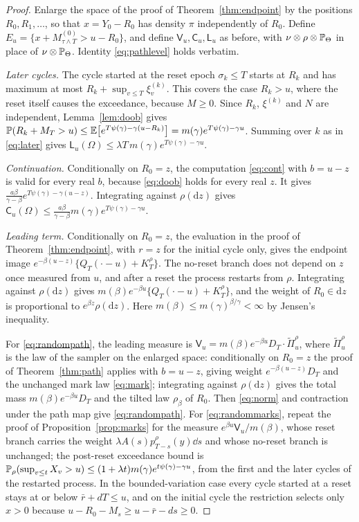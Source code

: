\documentclass[11pt,a4paper]{article}
\begin{document}
\begin{proof}
Enlarge the space of the proof of Theorem~\ref{thm:endpoint} by the positions $R_0,R_1,\dots$, so that $x=Y_0-R_0$ has density $\pi$ independently of $R_0$. Define $E_u=\{x+M^{(0)}_{\tau\wedge T}>u-R_0\}$, and define $\mathsf V_u,\mathsf C_u,\mathsf L_u$ as before, with $\nu\otimes\rho\otimes\mathbb P_\Theta$ in place of $\nu\otimes\mathbb P_\Theta$. Identity \eqref{eq:pathlevel} holds verbatim.

\emph{Later cycles.} The cycle started at the reset epoch $\sigma_k\le T$ starts at $R_k$ and has maximum at most $R_k+\sup_{v\le T}\xi^{(k)}_v$. This covers the case $R_k>u$, where the reset itself causes the exceedance, because $M\ge0$. Since $R_k$, $\xi^{(k)}$ and $N$ are independent, Lemma~\ref{lem:doob} gives $\mathbb P(R_k+M_T>u)\le\mathbb E\big[e^{T\psi(\gamma)-\gamma(u-R_k)}\big]=m(\gamma)e^{T\psi(\gamma)-\gamma u}$. Summing over $k$ as in \eqref{eq:later} gives $\mathsf L_u(\Omega)\le\lambda T\,m(\gamma)e^{T\psi(\gamma)-\gamma u}$.

\emph{Continuation.} Conditionally on $R_0=z$, the computation \eqref{eq:cont} with $b=u-z$ is valid for every real $b$, because \eqref{eq:doob} holds for every real $z$. It gives $\frac{a\beta}{\gamma-\beta}e^{T\psi(\gamma)-\gamma(u-z)}$. Integrating against $\rho(\mathrm dz)$ gives $\mathsf C_u(\Omega)\le\frac{a\beta}{\gamma-\beta}m(\gamma)e^{T\psi(\gamma)-\gamma u}$.

\emph{Leading term.} Conditionally on $R_0=z$, the evaluation in the proof of Theorem~\ref{thm:endpoint}, with $r=z$ for the initial cycle only, gives the endpoint image $e^{-\beta(u-z)}\{Q_T(\cdot-u)+K^\rho_T\}$. The no-reset branch does not depend on $z$ once measured from $u$, and after a reset the process restarts from $\rho$. Integrating against $\rho(\mathrm dz)$ gives $m(\beta)e^{-\beta u}\{Q_T(\cdot-u)+K^\rho_T\}$, and the weight of $R_0\in\mathrm dz$ is proportional to $e^{\beta z}\rho(\mathrm dz)$. Here $m(\beta)\le m(\gamma)^{\beta/\gamma}<\infty$ by Jensen's inequality.

For \eqref{eq:randompath}, the leading measure is $\mathsf V_u=m(\beta)e^{-\beta u}D_T\cdot\widetilde\Pi^\rho_u$, where $\widetilde\Pi^\rho_u$ is the law of the sampler on the enlarged space: conditionally on $R_0=z$ the proof of Theorem~\ref{thm:path} applies with $b=u-z$, giving weight $e^{-\beta(u-z)}D_T$ and the unchanged mark law \eqref{eq:mark}; integrating against $\rho(\mathrm dz)$ gives the total mass $m(\beta)e^{-\beta u}D_T$ and the tilted law $\rho_\beta$ of $R_0$. Then \eqref{eq:norm} and contraction under the path map give \eqref{eq:randompath}. For \eqref{eq:randommarks}, repeat the proof of Proposition~\ref{prop:marks} for the measure $e^{\beta u}\mathsf V_u/m(\beta)$, whose reset branch carries the weight $\lambda A(s)p^\rho_{T-s}(y)\dd s$ and whose no-reset branch is unchanged; the post-reset exceedance bound is $\mathbb P_\rho(\sup_{v\le t}X_v>u)\le(1+\lambda t)m(\gamma)e^{t\psi(\gamma)-\gamma u}$, from the first and the later cycles of the restarted process. In the bounded-variation case every cycle started at a reset stays at or below $\bar r+dT\le u$, and on the initial cycle the restriction selects only $x>0$ because $u-R_0-M_s\ge u-\bar r-ds\ge0$.
\end{proof}
\end{document}
